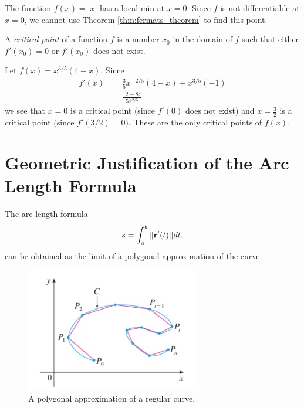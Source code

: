 \documentclass[12pt,letterpaper,reqno]{article}
\numberwithin{equation}{section}
\newcommand{\bbr}{{\bf r}}
\begin{document}
{\begin{example}
The function $f(x)=|x|$ has a local min at $x=0$. Since $f$ is not differentiable at $x=0$, we cannot use Theorem \ref{thm:fermats_theorem} to find this point.	
\end{example}

\begin{defn}
A \emph{critical point} of a function $f$ is a number $x_0$ in the domain of $f$ such that either $f'(x_0)=0$ or $f'(x_0)$ does not exist.	
\end{defn}

\begin{example}
Let $f(x)=x^{3/5}(4-x)$. Since
\begin{align*}
	f'(x)&=\frac{3}{5}x^{-2/5}(4-x)+x^{3/5}(-1) \\
	&=\frac{12-8x}{5x^{2/5}}
\end{align*}	
we see that $x=0$ is a critical point (since $f'(0)$ does not exist) and $x=\frac{3}{2}$ is a critical point (since $f'(3/2)=0$). These are the only critical points of $f(x)$.
\end{example}



\appendix
\section{Geometric Justification of the Arc Length Formula}\label{app:arc_length}
\begin{prop}
The arc length formula 
\begin{align}
	s=\int_a^b||\bbr'(t)||dt.
\end{align}
can be obtained as the limit of a polygonal approximation of the curve.
\end{prop}

\begin{figure}[h]
	\begin{center}
	\includegraphics[scale=0.5]{figures_mvc/polygonal_approx}
\end{center}
\caption{A polygonal approximation of a regular curve.}
\end{figure}

}
\end{document}
